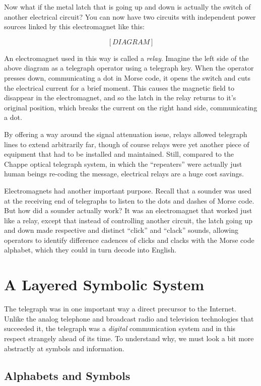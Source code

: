 \documentclass[UTF8]{book}
\begin{document}
\begin{CJK}{UTF8}{gbsn}
Now what if the metal latch that is going up and down is actually the switch of another electrical circuit? You can now have two circuits with independent power sources linked by this electromagnet like this:

\[ [DIAGRAM] \]

An electromagnet used in this way is called a \emph{relay}. Imagine the left side of the above diagram as a telegraph operator using a telegraph key. When the operator presses down, communicating a dot in Morse code, it opens the switch and cuts the electrical current for a brief moment. This causes the magnetic field to disappear in the electromagnet, and so the latch in the relay returns to it's original position, which breaks the current on the right hand side, communicating a dot.

By offering a way around the signal attenuation issue, relays allowed telegraph lines to extend arbitrarily far, though of course relays were yet another piece of equipment that had to be installed and maintained. Still, compared to the Chappe optical telegraph system, in which the ``repeaters'' were actually just human beings re-coding the message, electrical relays are a huge cost savings.

Electromagnets had another important purpose. Recall that a sounder was used at the receiving end of telegraphs to listen to the dots and dashes of Morse code. But how did a sounder actually work? It was an electromagnet that worked just like a relay, except that instead of controlling another circuit, the latch going up and down made respective and distinct ``click'' and ``clack'' sounds, allowing operators to identify difference cadences of clicks and clacks with the Morse code alphabet, which they could in turn decode into English.

\chapter{A Layered Symbolic System}

The telegraph was in one important way a direct precursor to the Internet. Unlike the analog telephone and broadcast radio and television technologies that succeeded it, the telegraph was a \emph{digital} communication system and in this respect strangely ahead of its time. To understand why, we must look a bit more abstractly at symbols and information.

\section{Alphabets and Symbols}


\end{CJK}
\end{document}
